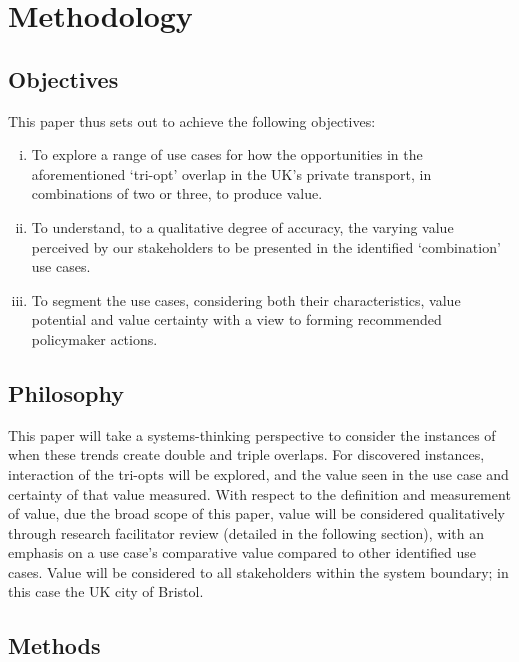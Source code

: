\documentclass[b5paper,10pt]{article}
\begin{document}
\section{Methodology}\label{methodology}

\subsection{Objectives}

This paper thus sets out to achieve the following objectives:

\begin{enumerate}[i)]
\item To explore a range of use cases for how the opportunities in the
  aforementioned `tri-opt' overlap in the UK's private transport, in
  combinations of two or three, to produce value.  
\item To understand, to a qualitative degree of accuracy,
  the varying value perceived by our stakeholders to be presented in
  the identified `combination' use cases. 
\item To segment the use cases, considering both their
  characteristics, value potential and value certainty with a view to forming
  recommended policymaker actions.
\end{enumerate}

\subsection{Philosophy}

This paper will take a systems-thinking perspective to consider the
instances of when these trends create double and triple overlaps. For
discovered instances, interaction of the tri-opts will be explored,
and the value seen in the use case and certainty of that value
measured. With respect to the definition and measurement of value, due
the broad scope of this paper, value will be considered qualitatively
through research facilitator review (detailed in the following
section), with an emphasis on a use case's comparative value compared
to other identified use cases. Value will be considered to all
stakeholders within the system boundary; in this case the UK city of
Bristol.

\subsection{Methods}
\end{document}
